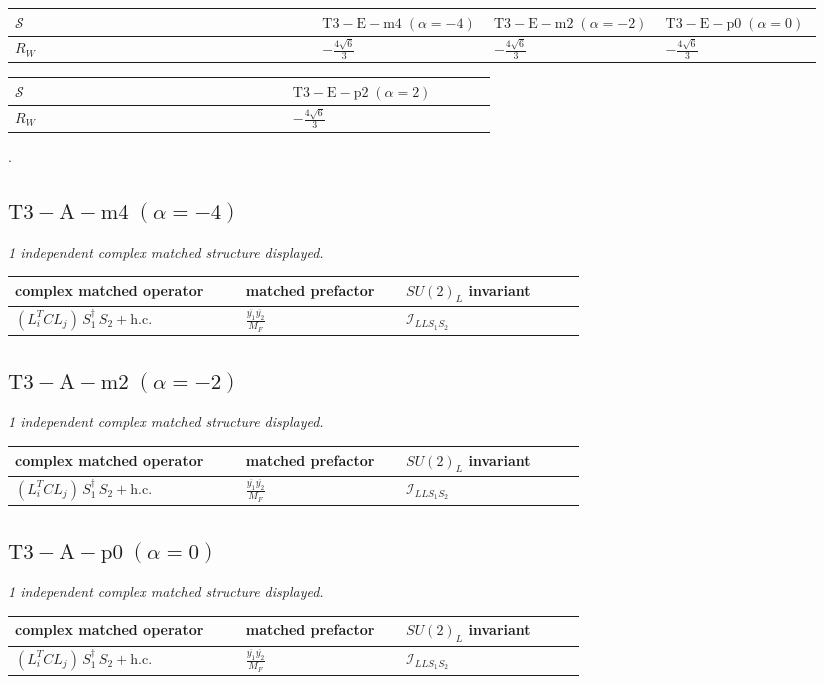 \documentclass[9pt]{article}
\begin{document}
\begin{longtable}{@{}p{0.37\linewidth}p{0.19\linewidth}p{0.19\linewidth}p{0.19\linewidth}@{}}
\toprule
$\mathcal{S}$ & $ \mathrm{T3-E-m4}\;(\alpha=-4) $ & $ \mathrm{T3-E-m2}\;(\alpha=-2) $ & $ \mathrm{T3-E-p0}\;(\alpha=0) $ \\
\midrule
$R_W$ & $ - \frac{4 \sqrt{6}}{3} $ & $ - \frac{4 \sqrt{6}}{3} $ & $ - \frac{4 \sqrt{6}}{3} $ \\
\bottomrule
\end{longtable}
\begin{longtable}{@{}p{0.37\linewidth}p{0.19\linewidth}@{}}
\toprule
$\mathcal{S}$ & $ \mathrm{T3-E-p2}\;(\alpha=2) $ \\
\midrule
$R_W$ & $ - \frac{4 \sqrt{6}}{3} $ \\
\bottomrule
\end{longtable}
.
\subsection*{$ \mathrm{T3-A-m4}\;(\alpha=-4) $}
\textit{1 independent complex matched structure displayed. }
\begin{longtable}{@{}p{0.36\linewidth}p{0.25\linewidth}p{0.29\linewidth}@{}}
\toprule
complex matched operator & matched prefactor & $SU(2)_L$ invariant \\
\midrule
$ (L_i^T C L_j)\,S_1^\dagger\,S_2+\mathrm{h.c.} $ & $ \frac{\overline{y_{1}} \overline{y_{2}}}{M_F} $ & $ \mathcal{I}_{LLS_1S_2} $ \\
\bottomrule
\end{longtable}
\subsection*{$ \mathrm{T3-A-m2}\;(\alpha=-2) $}
\textit{1 independent complex matched structure displayed. }
\begin{longtable}{@{}p{0.36\linewidth}p{0.25\linewidth}p{0.29\linewidth}@{}}
\toprule
complex matched operator & matched prefactor & $SU(2)_L$ invariant \\
\midrule
$ (L_i^T C L_j)\,S_1^\dagger\,S_2+\mathrm{h.c.} $ & $ \frac{\overline{y_{1}} \overline{y_{2}}}{M_F} $ & $ \mathcal{I}_{LLS_1S_2} $ \\
\bottomrule
\end{longtable}
\subsection*{$ \mathrm{T3-A-p0}\;(\alpha=0) $}
\textit{1 independent complex matched structure displayed. }
\begin{longtable}{@{}p{0.36\linewidth}p{0.25\linewidth}p{0.29\linewidth}@{}}
\toprule
complex matched operator & matched prefactor & $SU(2)_L$ invariant \\
\midrule
$ (L_i^T C L_j)\,S_1^\dagger\,S_2+\mathrm{h.c.} $ & $ \frac{\overline{y_{1}} \overline{y_{2}}}{M_F} $ & $ \mathcal{I}_{LLS_1S_2} $ \\
\bottomrule
\end{longtable}
\end{document}
